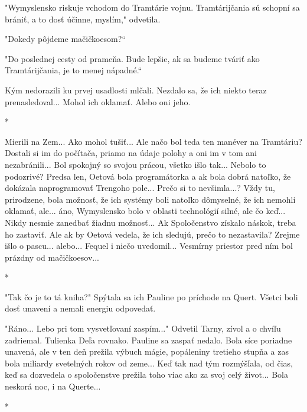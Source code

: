 \documentclass{book}
\begin{document}
"$ $Wymyslensko riskuje vchodom do Tramtárie vojnu. Tramtárijčania sú schopní sa brániť, a to dosť účinne, myslím,"$ $ odvetila.

"$ $Dokedy pôjdeme mačičkoesom?“

"$ $Do poslednej cesty od prameňa. Bude lepšie, ak sa budeme tváriť ako Tramtárijčania, je to menej nápadné.“

Kým nedorazili ku prvej usadlosti mlčali. Nezdalo sa, že ich niekto teraz prenasledoval... Mohol ich oklamať. Alebo oni jeho.

\begin{center}

*

\end{center}

Mierili na Zem... Ako mohol tušiť... Ale načo bol teda ten manéver na Tramtáriu? Dostali si im do počítača, priamo na údaje polohy a oni im v tom ani nezabránili... Bol spokojný so svojou prácou, všetko išlo tak... Nebolo to podozrivé? Predsa len, Oetová bola programátorka a ak bola dobrá natoľko, že dokázala naprogramovať Trengoho pole... Prečo si to nevšimla...? Vždy tu, prirodzene, bola možnosť, že ich systémy boli natoľko dômyselné, že ich nemohli oklamať, ale... áno, Wymyslensko bolo v oblasti technológií silné, ale čo keď... Nikdy nesmie zanedbať žiadnu možnosť... Ak Spoločenstvo získalo náskok, treba ho zastaviť. Ale ak by Oetová vedela, že ich sledujú, prečo to nezastavila? Zrejme išlo o pascu... alebo... Fequel i niečo uvedomil... Vesmírny priestor pred ním bol prázdny od mačičkoesov...

\begin{center}

*

\end{center}

"$ $Tak čo je to tá kniha?"$ $ Spýtala sa ich Pauline po príchode na Quert. Všetci boli dosť unavení a nemali energiu odpovedať.

"$ $Ráno... Lebo pri tom vysvetľovaní zaspím..."$ $ Odvetil Tarny, zívol a o chvíľu zadriemal. Tulienka Deľa rovnako. Pauline sa zaspať nedalo. Bola síce poriadne unavená, ale v ten deň prežila výbuch mágie, popáleniny tretieho stupňa a zas bola miliardy svetelných rokov od zeme... Keď tak nad tým rozmýšľala, od čias, keď sa dozvedela o spoločenstve prežila toho viac ako za svoj celý život... Bola neskorá noc, i na Querte...

\begin{center}

*

\end{center}
\end{document}
